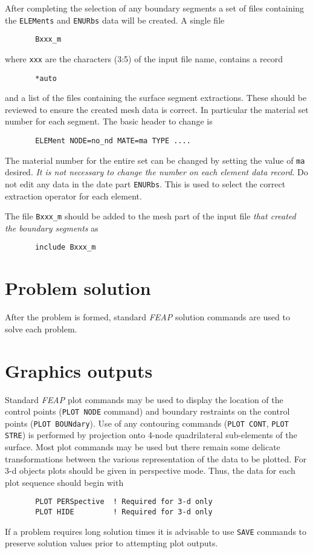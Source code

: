After completing the selection of any boundary segments a set of files containing the \texttt{ELEMents} and \texttt{ENURbs} data will be created.  A single
file
\begin{verbatim}
       Bxxx_m
\end{verbatim}
where \texttt{xxx} are the characters (3:5) of the input file name, contains
a record
\begin{verbatim}
       *auto
\end{verbatim}
and a list of the files containing the surface segment extractions.
These should be reviewed to ensure the created mesh data is correct.
In particular the material set number for each segment.
The basic header to change is
\begin{verbatim}
       ELEMent NODE=no_nd MATE=ma TYPE ....
\end{verbatim}
The material number for the entire set can be changed by setting the value of
\texttt{ma} desired.  \textit{It is not necessary to change the number on
each element data record}.  Do not edit any data in the date part
\texttt{ENURbs}.  This is used to select the correct extraction operator
for each element.

The file \texttt{Bxxx\_m} should be added to the mesh part of the input
file \textit{that created the boundary segments} as
\begin{verbatim}
       include Bxxx_m
\end{verbatim}

\section{Problem solution}

After the problem is formed, standard \textsl{FEAP} solution commands are
used to solve each problem.

\section{Graphics outputs}

Standard \textsl{FEAP} plot commands may be used to display the location of the
control points (\texttt{PLOT NODE} command) and boundary restraints on the
control points (\texttt{PLOT BOUNdary}).  Use of any contouring
commands (\texttt{PLOT CONT}, \texttt{PLOT STRE}) is performed by projection
onto 4-node quadrilateral sub-elements of the surface.  Most plot commands may be
used but there remain some delicate transformations between the various representation of the data to be plotted.  For 3-d objects plots should be given
in perspective mode.  Thus, the data for each plot sequence should begin with
\begin{verbatim}
       PLOT PERSpective  ! Required for 3-d only
       PLOT HIDE         ! Required for 3-d only
\end{verbatim}

If a problem requires long solution times it is advisable to use \texttt{SAVE}
commands to preserve solution values prior to attempting plot outputs.
